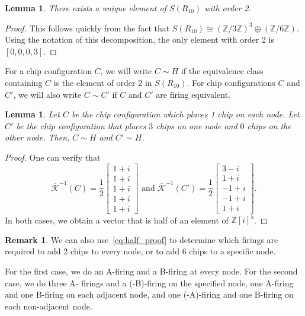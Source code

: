 \documentclass[12p]{amsart}
\numberwithin{equation}{section}
\theoremstyle{plain}
\newtheorem{lemma}[thm]{Lemma}
\theoremstyle{definition}
\newtheorem{remark}[thm]{Remark}
\newcommand{\Z}{\mathbb {Z}}
\begin{document}
\begin{lemma}
    There exists a unique element of $S(R_{10})$ with order 2. 
\end{lemma}
\begin{proof}
    This follows quickly from the fact that $S(R_{10}) \cong (\Z/3\Z)^3 \oplus (\Z/6\Z)$. Using the notation of this decomposition, the only element with order 2 is $[0,0,0,3]$.
\end{proof}

For a chip configuration $C$, we will write $C \sim H$ if the equivalence class containing $C$ is the element of order $2$ in $S(R_{10})$. For chip configurations $C$ and $C'$, we will also write $C \sim C'$ if $C$ and $C'$ are firing equivalent. 

\begin{lemma}\label{lem:half_vals} 
    Let $C$ be the chip configuration which places 1 chip on each node. Let $C'$ be the chip configuration that places $3$ chips on one node and $0$ chips on the other node. Then, $C \sim H$ and $C' \sim H$. 
\end{lemma}
\begin{proof}
    One can verify that 
    \begin{equation}\label{eq:half_proof}\overline{\mathcal K}^{-1}(C) = \frac12\begin{bmatrix}1 + i\\ 1 + i\\ 1 + i\\ 1 + i\\ 1 + i\end{bmatrix}\text{ and }\overline{\mathcal K}^{-1}(C') = \frac12\begin{bmatrix}3 -i\\ 1 + i\\ -1 + i\\ -1 + i\\ 1 + i\end{bmatrix}.\end{equation} In both cases, we obtain a vector that is half of an element of $\mathbb Z[i]^5$.  
\end{proof}

\begin{remark}\label{rem:specific}
    We can also use~\eqref{eq:half_proof} to determine which firings are required to add 2 chips to every node, or to add 6 chips to a specific node. 

    For the first case, we do an A-firing and a B-firing at every node. For the second case, we do three A- firings and a (-B)-firing on the specified node, one A-firing and one B-firing on each adjacent node, and one (-A)-firing and one B-firing on each non-adjacent node. 
\end{remark}
\end{document}
